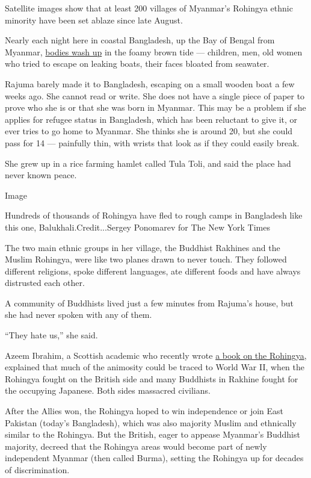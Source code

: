 Satellite images show that at least 200 villages of Myanmar's Rohingya
ethnic minority have been set ablaze since late August.

Nearly each night here in coastal Bangladesh, up the Bay of Bengal from
Myanmar,
\href{https://bdnews24.com/bangladesh/2017/09/28/bodies-of-16-rohingyas-mostly-children-wash-up-on-bangladesh-shore}{bodies
wash up} in the foamy brown tide --- children, men, old women who tried
to escape on leaking boats, their faces bloated from seawater.

Rajuma barely made it to Bangladesh, escaping on a small wooden boat a
few weeks ago. She cannot read or write. She does not have a single
piece of paper to prove who she is or that she was born in Myanmar. This
may be a problem if she applies for refugee status in Bangladesh, which
has been reluctant to give it, or ever tries to go home to Myanmar. She
thinks she is around 20, but she could pass for 14 --- painfully thin,
with wrists that look as if they could easily break.

She grew up in a rice farming hamlet called Tula Toli, and said the
place had never known peace.

Image

Hundreds of thousands of Rohingya have fled to rough camps in Bangladesh
like this one, Balukhali.Credit...Sergey Ponomarev for The New York
Times

The two main ethnic groups in her village, the Buddhist Rakhines and the
Muslim Rohingya, were like two planes drawn to never touch. They
followed different religions, spoke different languages, ate different
foods and have always distrusted each other.

A community of Buddhists lived just a few minutes from Rajuma's house,
but she had never spoken with any of them.

``They hate us,'' she said.

Azeem Ibrahim, a Scottish academic who recently wrote
\href{http://rohingyabook.com}{a book on the Rohingya}, explained that
much of the animosity could be traced to World War II, when the Rohingya
fought on the British side and many Buddhists in Rakhine fought for the
occupying Japanese. Both sides massacred civilians.

After the Allies won, the Rohingya hoped to win independence or join
East Pakistan (today's Bangladesh), which was also majority Muslim and
ethnically similar to the Rohingya. But the British, eager to appease
Myanmar's Buddhist majority, decreed that the Rohingya areas would
become part of newly independent Myanmar (then called Burma), setting
the Rohingya up for decades of discrimination.

